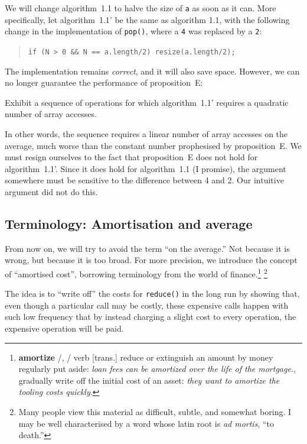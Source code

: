 \documentclass{tufte-handout}
\begin{document}
We will change algorithm~1.1 to halve the size of {\tt a} as soon as
it can.  
More specifically, let algorithm~1.1' be the same as algorithm 1.1,
with the following change in the implementation of {\tt pop()}, where
a {\tt 4} was replaced by a {\tt 2}:

\begin{quote}
  {\tt if (N > 0 \&\& N == a.length/2) resize(a.length/2);}
\end{quote}
   
The implementation remains \emph{correct}, and it will also save
space. 
However, we can no longer guarantee the performance of proposition~E:

\begin{ExerciseList}
  \Exercise Exhibit a sequence of operations for which
  algorithm~1.1' requires a quadratic number of array accesses.
\end{ExerciseList}

In other words, the sequence requires a linear number of array
accesses on the average, much worse than the constant number
prophesised by proposition~E. 
We must resign ourselves to the fact that proposition~E does not hold
for algorithm~1.1'.
Since it does hold for algorithm~1.1 (I promise), the argument
somewhere must be sensitive to the difference between 4 and 2.
Our intuitive argument did not do this.

\subsection{Terminology: Amortisation and average}

From now on, we will try to avoid the term ``on the average.'' 
Not because it is wrong, but because it is too broad.
For more precision, we introduce the concept of ``amortised cost'',
borrowing terminology from the world of finance.\footnote{
{\bf amortize} 
/, /
verb [trans.]
reduce or extinguish an amount by money regularly put aside:
\emph{loan fees can be amortized over the life of the mortgage.}, gradually write off the initial cost of an asset: \emph{they want to amortize the tooling costs quickly}.
}
\footnote{Many people view this material as  difficult, subtle, and somewhat
boring. I may be well
characterised by a word whose latin root is \emph{ad mortis}, ``to death.''}

The idea is to ``write off'' the costs for {\tt reduce()} in the long
run by showing that, even though a particular call may be costly,
these expensive calls happen with such low frequency that by instead
charging a slight cost to every operation, the expensive operation
will be paid.
\end{document}
